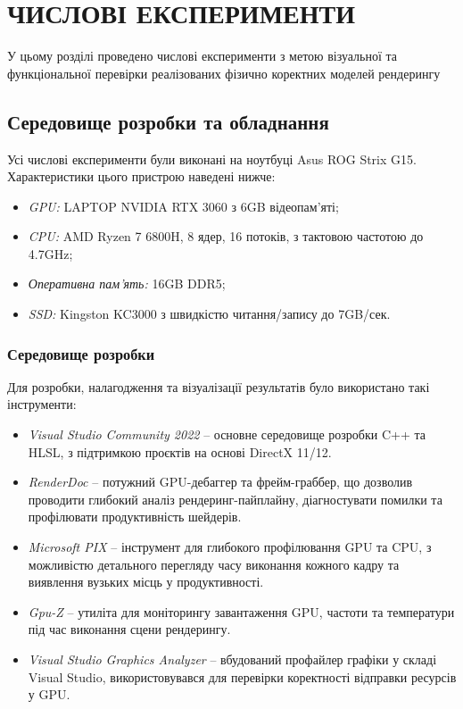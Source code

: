 \chapter{ЧИСЛОВІ ЕКСПЕРИМЕНТИ}
У цьому розділі проведено числові експерименти з метою візуальної та функціональної перевірки реалізованих фізично коректних моделей рендерингу

\section{Середовище розробки та обладнання}
\setcounter{equation}{0}
\setcounter{theorem}{0}    

Усі числові експерименти були виконані на ноутбуці Asus ROG Strix G15. Характеристики цього пристрою наведені нижче:

\begin{itemize}
    \item \emph{GPU:} LAPTOP NVIDIA RTX 3060 з 6GB відеопам'яті;
    \item \emph{CPU:} AMD Ryzen 7 6800H, 8 ядер, 16 потоків, з тактовою частотою до 4.7GHz;
    \item \emph{Оперативна пам'ять:} 16GB DDR5;
    \item \emph{SSD:} Kingston KC3000 з швидкістю читання/запису до 7GB/сек.
\end{itemize}

\subsection{Середовище розробки}

Для розробки, налагодження та візуалізації результатів було використано такі інструменти:

\begin{itemize}
    \item \emph{Visual Studio Community 2022} -- основне середовище розробки C++ та HLSL, з підтримкою проєктів на основі DirectX 11/12.
    
    \item \emph{RenderDoc} -- потужний GPU-дебаггер та фрейм-граббер, що дозволив проводити глибокий аналіз рендеринг-пайплайну, діагностувати помилки та профілювати продуктивність шейдерів.
    
    \item \emph{Microsoft PIX} -- інструмент для глибокого профілювання GPU та CPU, з можливістю детального перегляду часу виконання кожного кадру та виявлення вузьких місць у продуктивності.
    
    \item \emph{Gpu-Z} -- утиліта для моніторингу завантаження GPU, частоти та температури під час виконання сцени рендерингу.
    
    \item \emph{Visual Studio Graphics Analyzer} -- вбудований профайлер графіки у складі Visual Studio, використовувався для перевірки коректності відправки ресурсів у GPU.
\end{itemize}


